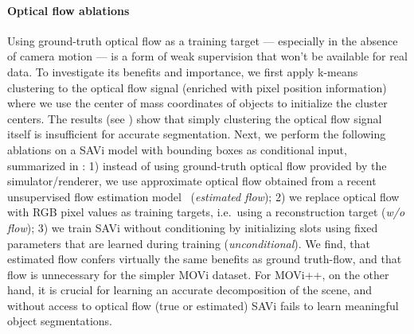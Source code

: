 \documentclass{article}
\newcommand{\modelname}{SAVi\xspace}
\begin{document}
\paragraph{Optical flow ablations}
Using ground-truth optical flow as a training target --- especially in the absence of camera motion --- is a form of weak supervision that won't be available for real data.
To investigate its benefits and importance, we first apply k-means clustering to the optical flow signal (enriched with pixel position information) where we use the center of mass coordinates of objects to initialize the cluster centers.
The results (see ) show that simply clustering the optical flow signal itself is insufficient for accurate segmentation.
Next, we perform the following ablations on a SAVi model with bounding boxes as conditional input, summarized in : 1) instead of using ground-truth optical flow provided by the simulator/renderer, we use approximate optical flow obtained from a recent unsupervised flow estimation model~\citep{stone2021smurf} (\textit{estimated flow}); 2) we replace optical flow with RGB pixel values as training targets, i.e.~using a reconstruction target (\textit{w/o flow}); 3) we train SAVi without conditioning by initializing slots using fixed parameters that are learned during training (\textit{unconditional}). 
We find, that estimated flow confers virtually the same benefits as ground truth-flow, and that flow is unnecessary for the simpler MOVi dataset.
For MOVi++, on the other hand, it is crucial for learning an accurate decomposition of the scene, and without access to optical flow (true or estimated) \modelname fails to learn meaningful object segmentations.
\end{document}
